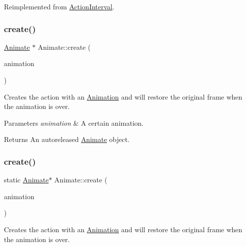 Reimplemented from \hyperlink{classActionInterval_abc93ce0c2f54a90eb216a7803f25f44a}{Action\+Interval}.

\mbox{\label{classAnimate_aaa1198ded0f8c25bd265ed8b0b9d8a1c}} 
\subsubsection{\texorpdfstring{create()}{create()}\hspace{0.1cm}{\footnotesize\ttfamily [1/2]}}
{\footnotesize\ttfamily \hyperlink{classAnimate}{Animate} $\ast$ Animate\+::create (\begin{DoxyParamCaption}\item[{\hyperlink{classAnimation}{Animation} $\ast$}]{animation }\end{DoxyParamCaption})\hspace{0.3cm}{\ttfamily [static]}}

Creates the action with an \hyperlink{classAnimation}{Animation} and will restore the original frame when the animation is over.


\begin{DoxyParams}{Parameters}
{\em animation} & A certain animation. \\
\hline
\end{DoxyParams}
\begin{DoxyReturn}{Returns}
An autoreleased \hyperlink{classAnimate}{Animate} object. 
\end{DoxyReturn}
\mbox{\label{classAnimate_a54e2e0807ac2a9d6542f478c60703de5}} 
\subsubsection{\texorpdfstring{create()}{create()}\hspace{0.1cm}{\footnotesize\ttfamily [2/2]}}
{\footnotesize\ttfamily static \hyperlink{classAnimate}{Animate}$\ast$ Animate\+::create (\begin{DoxyParamCaption}\item[{\hyperlink{classAnimation}{Animation} $\ast$}]{animation }\end{DoxyParamCaption})\hspace{0.3cm}{\ttfamily [static]}}

Creates the action with an \hyperlink{classAnimation}{Animation} and will restore the original frame when the animation is over.


